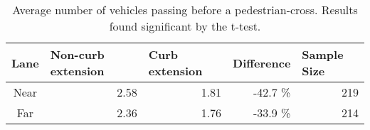 \begin{table}[!htbp]
\centering
\begin{tabular}{@{}crrrr@{}}
\toprule
\multicolumn{1}{l}{Lane} & \multicolumn{1}{l}{Non-curb extension} & \multicolumn{1}{l}{Curb extension} & \multicolumn{1}{l}{Difference} & \multicolumn{1}{l}{Sample Size} \\ \midrule
Near                     & 2.58                                   & 1.81                               & -42.7 \%                            & 219                             \\
Far                      & 2.36                                   & 1.76                               & -33.9  \%                           & 214                           \\
\bottomrule 
\end{tabular}
\caption[Average number of vehicles passing before a pedestrian-cross]{Average number of vehicles passing before a pedestrian-cross. Results found significant by the t-test.}\label{table:vehicles-passed}
\end{table}